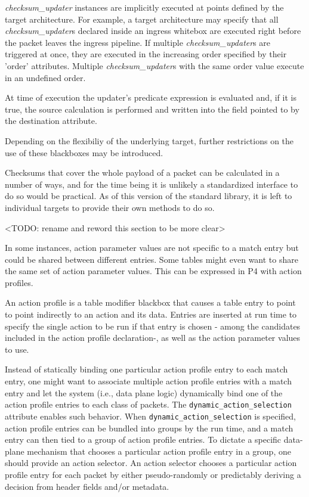 \documentclass[12pt]{article}
\begin{document}
\textit{checksum_updater} instances are implicitly executed at points defined by
the target architecture. For example, a target architecture may specify that all
\textit{checksum_updater}s declared inside an ingress whitebox are executed
right before the packet leaves the  ingress pipeline. If multiple
\textit{checksum_updater}s are triggered at once, they are executed in the
increasing order specified by their 'order' attributes. Multiple
\textit{checksum_updater}s with the same order value execute in an undefined
order.

At time of execution the updater's predicate expression is evaluated and, if
it is true, the source calculation is performed and written into the field
pointed to by the destination attribute.

Depending on the flexibiliy of the underlying target, further restrictions
on the use of these blackboxes may be introduced.

Checksums that cover the whole payload of a packet can be calculated in a
number of ways, and for the time being it is unlikely a standardized interface
to do so would be practical. As of this version of the standard library, it is 
left to individual targets to provide their own methods to do so.



<TODO: rename and reword this section to be more clear>

In some instances, action parameter values are not specific to a match entry but
could be shared between different entries. Some tables might even want to share
the same set of action parameter values. This can be expressed in P4 with
action profiles.

An action profile is a table modifier blackbox that causes a table entry to
point to point indirectly to an action and its data. Entries are inserted at run
time to specify the single action to be run if that entry is chosen - among the
candidates included in the action profile declaration-, as well as the action
parameter values to use.

Instead of statically binding one particular action profile entry to each match
entry, one might want to associate multiple action profile entries with a match
entry and let the system (i.e., data plane logic) dynamically bind one of the
action profile entries to each class of packets. The
\texttt{dynamic_action_selection} attribute enables such behavior. When
\texttt{dynamic_action_selection} is specified, action profile entries can be
bundled into groups by the run time, and a match entry can then tied to a group
of action profile entries. To dictate a specific data-plane mechanism that
chooses a particular action profile entry in a group, one should provide an
action selector. An action selector chooses a particular action profile entry
for each packet by either pseudo-randomly or predictably deriving a decision
from header fields and/or metadata.
\end{document}
